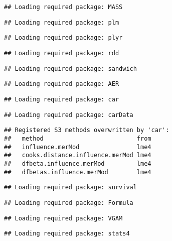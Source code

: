 \documentclass[]{article}
\begin{document}
\begin{verbatim}
## Loading required package: MASS
\end{verbatim}

\begin{verbatim}
## Loading required package: plm
\end{verbatim}

\begin{verbatim}
## Loading required package: plyr
\end{verbatim}

\begin{verbatim}
## Loading required package: rdd
\end{verbatim}

\begin{verbatim}
## Loading required package: sandwich
\end{verbatim}

\begin{verbatim}
## Loading required package: AER
\end{verbatim}

\begin{verbatim}
## Loading required package: car
\end{verbatim}

\begin{verbatim}
## Loading required package: carData
\end{verbatim}

\begin{verbatim}
## Registered S3 methods overwritten by 'car':
##   method                          from
##   influence.merMod                lme4
##   cooks.distance.influence.merMod lme4
##   dfbeta.influence.merMod         lme4
##   dfbetas.influence.merMod        lme4
\end{verbatim}

\begin{verbatim}
## Loading required package: survival
\end{verbatim}

\begin{verbatim}
## Loading required package: Formula
\end{verbatim}

\begin{verbatim}
## Loading required package: VGAM
\end{verbatim}

\begin{verbatim}
## Loading required package: stats4
\end{verbatim}
\end{document}

